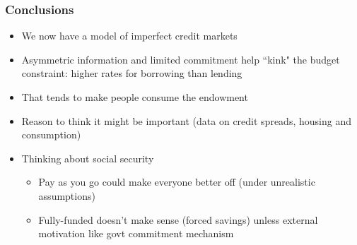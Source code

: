 \documentclass{beamer}
\begin{document}
 \begin{frame}
\frametitle[alignment=center]{Conclusions}
\begin{itemize}
\item We now have a model of imperfect credit markets
\bigskip
\item Asymmetric information and limited commitment help ``kink" the budget constraint: higher rates for borrowing than lending
\bigskip
\item That tends to make people consume the endowment
\bigskip
\item Reason to think it might be important (data on credit spreads, housing and consumption)
\bigskip
\item Thinking about social security
\begin{itemize}
\item Pay as you go could make everyone better off (under unrealistic assumptions)
\item Fully-funded doesn't make sense (forced savings) unless external motivation like govt commitment mechanism
\end{itemize}
\end{itemize}
 \end{frame}
\end{document}
